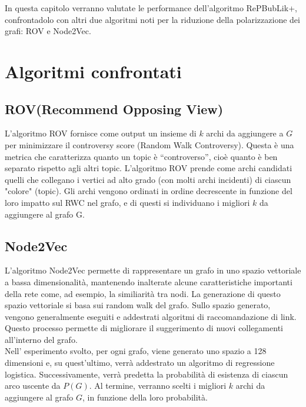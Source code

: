 In questa capitolo verranno valutate le performance dell'algoritmo RePBubLik+, confrontadolo
con altri due algoritmi noti per la riduzione della polarizzazione dei grafi: ROV e Node2Vec.

\section{Algoritmi confrontati}
\subsection{ROV(Recommend Opposing View)}
L'algoritmo ROV\cite{ROV} fornisce come output un insieme di $k$ archi da aggiungere a $G$ per minimizzare
il controversy score (Random Walk Controversy). Questa è una metrica che caratterizza quanto un topic
è ``controverso'', cioè quanto è ben separato rispetto agli altri topic. L'algoritmo ROV prende come 
archi candidati quelli che collegano i vertici ad alto grado (con molti archi incidenti) di ciascun "colore"
(topic). Gli archi vengono ordinati in ordine decrescente in funzione del loro impatto sul RWC nel grafo, 
e di questi si individuano i migliori $k$ da aggiungere al grafo G.

\subsection{Node2Vec}
L'algoritmo Node2Vec\cite{Node2Vec} permette di rappresentare un grafo in uno spazio vettoriale a bassa dimensionalità, mantenendo
inalterate alcune caratteristiche importanti della rete come, ad esempio, la similiarità tra nodi.
La generazione di questo spazio vettoriale si basa sui random walk del grafo. Sullo spazio generato,
vengono generalmente eseguiti e addestrati algoritmi di raccomandazione di link. Questo processo permette
di migliorare il suggerimento di nuovi collegamenti all'interno del grafo.
\\
Nell' esperimento svolto, per ogni grafo, viene generato uno spazio a 128 dimensioni e, su quest'ultimo, verrà addestrato
un algoritmo di regressione logistica. Successivamente, verrà predetta la probabilità di esistenza di ciascun arco uscente da $P(G)$.
Al termine, verranno scelti i migliori $k$ archi da aggiungere al grafo $G$, in funzione della loro probabilità.

